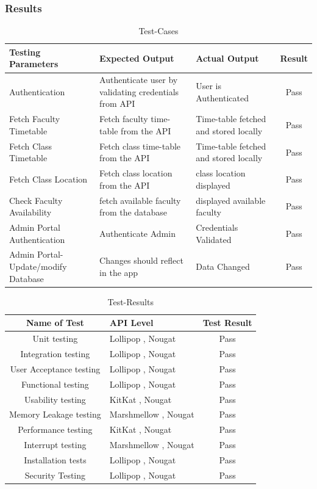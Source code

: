 \documentclass[BTech]{srmuthesis}
\begin{document}
\subsubsection{Results}
\begin{table}[htbp]
	\centering
\begin{tabular}{|L|L|L|c|}

	\hline
	Testing Parameters & Expected Output  & Actual Output &Result\\
	\hline
		\hline
	Authentication & Authenticate user by validating credentials from \ac{API} & User is Authenticated &Pass\\
		\hline
	Fetch Faculty Timetable & Fetch faculty time-table from the \ac{API} & Time-table fetched and stored locally &Pass\\
		\hline
	Fetch Class Timetable & Fetch class time-table from the \ac{API} & Time-table fetched and stored locally &Pass\\
		\hline
	Fetch Class Location &  Fetch class location from the \ac{API} & class location displayed & Pass\\
		\hline
	Check Faculty Availability & fetch available faculty from the database & displayed available faculty &Pass\\
		\hline
	Admin Portal Authentication & Authenticate Admin &Credentials Validated &Pass\\
		\hline
	Admin Portal-Update/modify Database   & Changes should reflect in the app & Data Changed &Pass\\
	\hline
\end{tabular}
\caption{Test-Cases}
\label{tab:test-cases}
  \end{table}
\begin{table}[htbp]
	\centering
\begin{tabular}{|c|L|c|}
	\hline
	Name of Test & \ac{API} Level & Test Result\\
	\hline
		\hline
	Unit testing & Lollipop , Nougat & Pass\\
		\hline
	Integration testing & Lollipop , Nougat & Pass\\
		\hline
	User Acceptance testing & Lollipop , Nougat & Pass\\
		\hline
	Functional testing & Lollipop , Nougat & Pass\\
		\hline
	Usability testing & KitKat , Nougat & Pass \\
		\hline
	Memory Leakage testing & Marshmellow , Nougat & Pass\\
		\hline
	Performance testing   & KitKat , Nougat & Pass\\
		\hline
	Interrupt testing & Marshmellow , Nougat & Pass\\
		\hline
	Installation tests & Lollipop , Nougat & Pass\\
		\hline
	Security Testing & Lollipop , Nougat & Pass\\
	
	\hline
\end{tabular}
\caption{Test-Results}
\label{tab:test-results}
\end{table}
\end{document}
